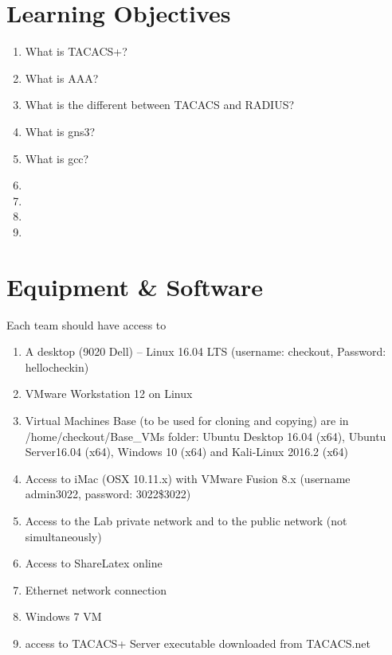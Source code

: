 \documentclass[main.tex]{subfiles}
\begin{document}
\section{Learning Objectives}\label{sec 1}
\begin{enumerate}[noitemsep,label=$\bullet$,leftmargin=16mm,labelsep=0.5cm]
\item What is TACACS+?
\item What is AAA?
\item What is the different between TACACS and RADIUS?
\item What is gns3?
\item What is gcc?
\item 
\item 
\item 
\item 
\end{enumerate}

\section{Equipment \& Software}\label{sec2}
Each team should have access to 
\begin{enumerate}[noitemsep,label=$\bullet$,leftmargin=16mm,labelsep=0.5cm]
\item{A desktop (9020 Dell) – Linux 16.04 LTS (username: checkout, Password: hellocheckin)}
\item{VMware Workstation 12 on Linux}
\item{Virtual Machines Base (to be used for cloning and copying) are in /home/checkout/Base\_VMs folder:
Ubuntu Desktop 16.04 (x64), Ubuntu Server16.04 (x64), Windows 10 (x64) and Kali-Linux 2016.2 (x64)}
\item{Access to iMac (OSX 10.11.x) with VMware Fusion 8.x (username admin3022, password: 3022\$3022)}
\item{Access to the Lab private network and to the public network (not simultaneously)}
\item{Access to ShareLatex online}
\item{Ethernet network connection} 
\item Windows 7 VM
\item access to TACACS+ Server executable downloaded from TACACS.net
\end{enumerate}
\end{document}
